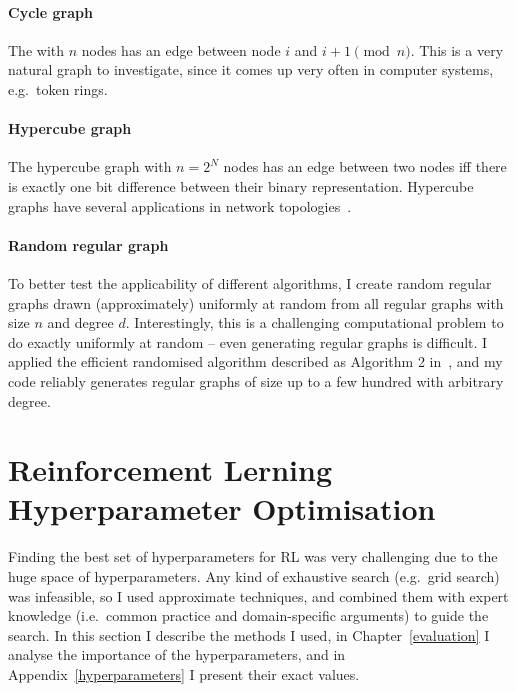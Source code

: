 \paragraph{Cycle graph} The \CycleGraph with $n$ nodes has an edge between node $i$ and $i+1 \pmod{n}$. This is a very natural graph to investigate, since it comes up very often in computer systems, e.g.\ token rings.


\paragraph{Hypercube graph} The hypercube graph with $n=2^N$ nodes has an edge between two nodes iff there is exactly one bit difference between their binary representation. Hypercube graphs have several applications in network topologies~\cite{ostrouchov1987hypercubenetwork}.


\paragraph{Random regular graph} To better test the applicability of different algorithms, I create random regular graphs drawn (approximately) uniformly at random from all regular graphs with size $n$ and degree $d$. Interestingly, this is a challenging computational problem to do exactly uniformly at random -- even generating regular graphs is difficult. I applied the efficient randomised algorithm described as Algorithm 2 in~\cite{steger1999randomregulargraphs}, and my code reliably generates regular graphs of size up to a few hundred with arbitrary degree.


\section{Reinforcement Lerning Hyperparameter Optimisation}

Finding the best set of hyperparameters for RL was very challenging due to the huge space of hyperparameters. Any kind of exhaustive search (e.g.\ grid search) was infeasible, so I used approximate techniques, and combined them with expert knowledge (i.e.\ common practice and domain-specific arguments) to guide the search.
In this section I describe the methods I used, in Chapter~\ref{evaluation} I analyse the importance of the hyperparameters, and in Appendix~\ref{hyperparameters} I present their exact values.


